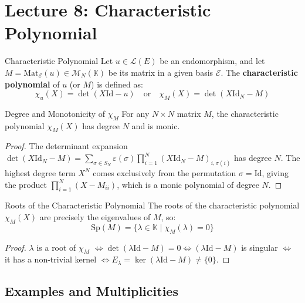 \documentclass[11pt, a4paper]{article}
\begin{document}
\section{Lecture 8: Characteristic Polynomial}

\begin{definition}{Characteristic Polynomial}{}
Let $u \in \mathcal{L}(E)$ be an endomorphism, and let $M = \text{Mat}_{\mathcal{E}}(u) \in \mathcal{M}_N(\mathbb{K})$ be its matrix in a given basis $\mathcal{E}$.
The \textbf{characteristic polynomial} of $u$ (or $M$) is defined as:
$$ \chi_u(X) = \det(X\text{Id} - u) \quad \text{or} \quad \chi_M(X) = \det(X\text{Id}_N - M) $$ %
\end{definition}

\begin{proposition}{Degree and Monotonicity of $\chi_M$}{}
For any $N \times N$ matrix $M$, the characteristic polynomial $\chi_M(X)$ has degree $N$ and is monic.
\end{proposition}
\begin{proof}
The determinant expansion $\det(X\text{Id}_N - M) = \sum_{\sigma \in S_N} \varepsilon(\sigma) \prod_{i=1}^N (X\text{Id}_N - M)_{i, \sigma(i)}$ has degree $N$.
The highest degree term $X^N$ comes exclusively from the permutation $\sigma = \text{Id}$, giving the product $\prod_{i=1}^N (X - M_{ii})$, which is a monic polynomial of degree $N$.
\end{proof}

\begin{proposition}{Roots of the Characteristic Polynomial}{}
The roots of the characteristic polynomial $\chi_M(X)$ are precisely the eigenvalues of $M$, so:
$$ \text{Sp}(M) = \{ \lambda \in \mathbb{K} \mid \chi_M(\lambda) = 0 \} $$ %
\end{proposition}
\begin{proof}
$\lambda$ is a root of $\chi_M$ $\iff \det(\lambda\text{Id} - M) = 0 \iff (\lambda\text{Id} - M)$ is singular $\iff$ it has a non-trivial kernel $\iff E_\lambda = \ker(\lambda\text{Id} - M) \neq \{0\}$.
\end{proof}

\subsection{Examples and Multiplicities}
\end{document}
